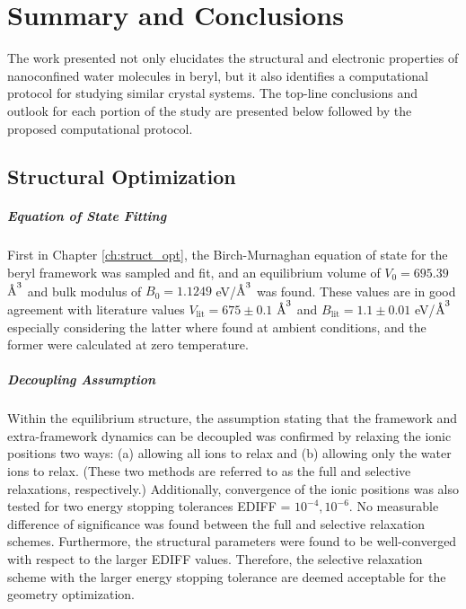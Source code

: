 
\chapter{Summary and Conclusions}
\label{chap:conclusions}


The work presented not only elucidates the structural and electronic properties of nanoconfined water molecules in beryl, but it also identifies a computational protocol for studying similar crystal systems. The top-line conclusions and outlook for each portion of the study are presented below followed by the proposed computational protocol.

\section{Structural Optimization} 

\paragraph{Equation of State Fitting} First in Chapter \ref{ch:struct_opt}, the Birch-Murnaghan equation of state for the beryl framework was sampled and fit, and an equilibrium volume of $V_0= 695.39$ $\text{\normalfont\AA}^3$ and bulk modulus of $B_0 = 1.1249$ eV/$\text{\normalfont\AA}^3$ was found. These values are in good agreement with literature values \textemdash  $V_\text{lit} = 675\pm0.1$ $\text{\normalfont\AA}^3$ and $B_\text{lit} = 1.1\pm0.01$ eV/$\text{\normalfont\AA}^3$ \textemdash especially considering the latter where found at ambient conditions, and the former were calculated at zero temperature. 

\paragraph{Decoupling Assumption} Within the equilibrium structure, the assumption stating that the framework and extra-framework dynamics can be decoupled was confirmed by relaxing the ionic positions two ways: (a) allowing all ions to relax and (b) allowing only the water ions to relax. (These two methods are referred to as the full and selective relaxations, respectively.) Additionally, convergence of the ionic positions was also tested for two energy stopping tolerances EDIFF = $10^{-4},10^{-6}$. No measurable difference of significance was found between the full and selective relaxation schemes. Furthermore, the structural parameters were found to be well-converged with respect to the larger EDIFF values. Therefore, the selective relaxation scheme with the larger energy stopping tolerance are deemed acceptable for the geometry optimization.

